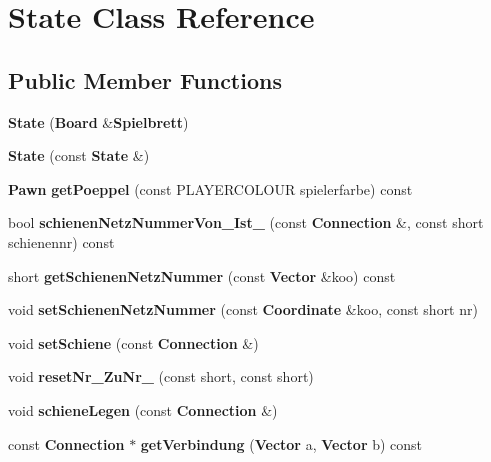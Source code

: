 \section{State Class Reference}
\label{class_state}
\subsection*{Public Member Functions}
\begin{DoxyCompactItemize}
\item 
{\bfseries State} ({\bf Board} \&{\bf Spielbrett})\label{class_state_ab8e8b562af12bba2ae71a14fcfd87673}

\item 
{\bfseries State} (const {\bf State} \&)\label{class_state_a5ca97340266d486dfa42225f19c40de3}

\item 
{\bf Pawn} {\bfseries get\-Poeppel} (const P\-L\-A\-Y\-E\-R\-C\-O\-L\-O\-U\-R spielerfarbe) const \label{class_state_a5ddfbac7a481236179ace80166f69da8}

\item 
bool {\bfseries schienen\-Netz\-Nummer\-Von\-\_\-\-Ist\-\_\-} (const {\bf Connection} \&, const short schienennr) const \label{class_state_a974ccf0cdff0adc321603f11c8df7970}

\item 
short {\bfseries get\-Schienen\-Netz\-Nummer} (const {\bf Vector} \&koo) const \label{class_state_a5d32c5f1439d14757830b7bbd6fde7cb}

\item 
void {\bfseries set\-Schienen\-Netz\-Nummer} (const {\bf Coordinate} \&koo, const short nr)\label{class_state_a61e844e517116c5ec1eaeb6886906df8}

\item 
void {\bfseries set\-Schiene} (const {\bf Connection} \&)\label{class_state_afa0cf80f1e1cc065fd63372c8ffc19be}

\item 
void {\bfseries reset\-Nr\-\_\-\-Zu\-Nr\-\_\-} (const short, const short)\label{class_state_ade757a61a90c393f8b7a3495221f1779}

\item 
void {\bfseries schiene\-Legen} (const {\bf Connection} \&)\label{class_state_a76034aee14f5704a970a7b4a831935e7}

\item 
const {\bf Connection} $\ast$ {\bfseries get\-Verbindung} ({\bf Vector} a, {\bf Vector} b) const \label{class_state_a668add718e776deb4fd34c5dbaeabfb5}


\end{DoxyCompactItemize}
